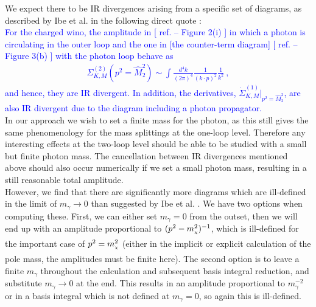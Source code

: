 \documentclass[11pt]{article}
\newcommand{\mychi}{\raisebox{0pt}[1ex][1ex]{\tiny$\chi$}}
\def\mc{m_{\mychi}}
\begin{document}
We expect there to be IR divergences arising from a specific set of diagrams, as described by Ibe et al. in the following direct quote \cite{Ibe2013a}:\\

\textcolor{blue}{
For the charged wino, the amplitude in [ ref. \cite{Ibe2013a} -- Figure 2(i) ] in which a photon is circulating
in the outer loop and the one in [the counter-term diagram] [ ref. \cite{Ibe2013a} -- Figure 3(b) ] with the photon loop behave as
\begin{eqnarray}
\Sigma_{K,M}^{(2)}(p^2=\hat{M}_2^2) \sim
\int \frac{d^4 k}{(2\pi)^4} \frac{1}{(k\cdot p)^2} \frac{1}{k^2} \ ,
\end{eqnarray}
and hence, they are IR divergent.
In addition, the derivatives, $\dot{\Sigma}_{K,M}^{(1)} |_{p^2=\hat{M}_2^2}$, 
are also IR divergent due to the diagram including a photon propagator. 
}\\

In our approach we wish to set a finite mass for the photon, as this still gives the same phenomenology for the mass splittings at the one-loop level.  Therefore any interesting effects at the two-loop level should be able to be studied with a small but finite photon mass.  The cancellation between IR divergences mentioned above should also occur numerically if we set a small photon mass, resulting in a still reasonable total amplitude.\\

However, we find that there are significantly more diagrams which are ill-defined in the limit of $m_{\gamma}\rightarrow 0$ than suggested by Ibe et al. \cite{Ibe2013a}.  We have two options when computing these.  First, we can either set $m_{\gamma}=0$ from the outset, then we will end up with an amplitude proportional to $(p^2-\mc^2)^{-1}$, which is ill-defined for the important case of $p^2=\mc^2$ (either in the implicit or explicit calculation of the pole mass, the amplitudes must be finite here).  The second option is to leave a finite $m_{\gamma}$ throughout the calculation and subsequent basis integral reduction, and substitute $m_{\gamma}\rightarrow 0$ at the end.  This results in an amplitude proportional to $m_{\gamma}^{-2}$ or in a basis integral which is not defined at $m_{\gamma}=0$, so again this is ill-defined.\\
\end{document}
